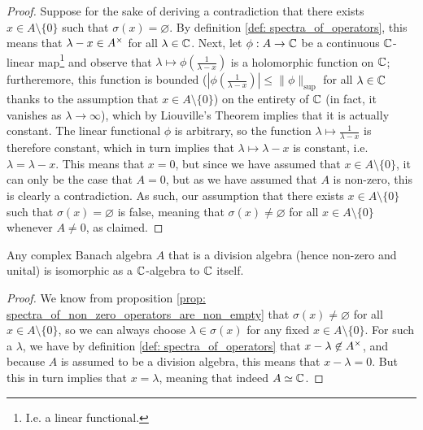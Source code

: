             \begin{proof}
                Suppose for the sake of deriving a contradiction that there exists $x \in A \setminus \{0\}$ such that $\sigma(x) = \varnothing$. By definition \ref{def: spectra_of_operators}, this means that $\lambda - x \in A^{\x}$ for all $\lambda \in \mathbb{C}$. Next, let $\phi: A \to \mathbb{C}$ be a continuous $\mathbb{C}$-linear map\footnote{I.e. a linear functional.} and observe that $\lambda \mapsto \phi\left(\frac{1}{\lambda - x}\right)$ is a holomorphic function on $\mathbb{C}$; furtheremore, this function is bounded ($\left|\phi\left(\frac{1}{\lambda - x}\right)\right| \leq \|\phi\|_{\sup}$ for all $\lambda \in \mathbb{C}$ thanks to the assumption that $x \in A \setminus \{0\}$) on the entirety of $\mathbb{C}$ (in fact, it vanishes as $\lambda \to \infty$), which by Liouville's Theorem implies that it is actually constant. The linear functional $\phi$ is arbitrary, so the function $\lambda \mapsto \frac{1}{\lambda - x}$ is therefore constant, which in turn implies that $\lambda \mapsto \lambda - x$ is constant, i.e. $\lambda = \lambda - x$. This means that $x = 0$, but since we have assumed that $x \in A \setminus \{0\}$, it can only be the case that $A = 0$, but as we have assumed that $A$ is non-zero, this is clearly a contradiction. As such, our assumption that there exists $x \in A \setminus \{0\}$ such that $\sigma(x) = \varnothing$ is false, meaning that $\sigma(x) \not = \varnothing$ for all $x \in A \setminus \{0\}$ whenever $A \not = 0$, as claimed.
            \end{proof}
        \begin{corollary} \label{coro: banach_division_algebras_are_isomorphic_to_ground_field}
            Any complex Banach algebra $A$ that is a division algebra (hence non-zero and unital) is isomorphic as a $\mathbb{C}$-algebra to $\mathbb{C}$ itself.
        \end{corollary}
            \begin{proof}
                We know from proposition \ref{prop: spectra_of_non_zero_operators_are_non_empty} that $\sigma(x) \not = \varnothing$ for all $x \in A \setminus \{0\}$, so we can always choose $\lambda \in \sigma(x)$ for any fixed $x \in A \setminus \{0\}$. For such a $\lambda$, we have by definition \ref{def: spectra_of_operators} that $x - \lambda \not \in A^{\x}$, and because $A$ is assumed to be a division algebra, this means that $x - \lambda = 0$. But this in turn implies that $x = \lambda$, meaning that indeed $A \simeq \mathbb{C}$.
            \end{proof}
